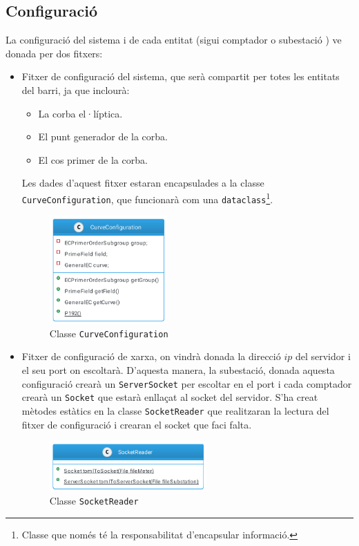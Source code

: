 \subsection{Configuració}
La configuració del sistema i de cada entitat (sigui comptador o subestació ) ve donada per dos fitxers:
\begin{itemize}
	\item Fitxer de configuració del sistema, que serà compartit per totes les entitats del barri, ja que inclourà:
	\begin{itemize}
		\item La corba el·líptica.
		\item El punt generador de la corba.
		\item El cos primer de la corba.
	\end{itemize}
	Les dades d'aquest fitxer estaran encapsulades a la classe \texttt{CurveConfiguration}, que funcionarà com una \texttt{dataclass}\footnote{Classe que només té la responsabilitat d'encapsular informació.}.
	\begin{figure}[H]
		\centering
		\includegraphics[width=4.5cm]{classes/curve.png}
		\caption{Classe \texttt{CurveConfiguration}}
		\label{fig:curve}
	\end{figure}
	\item Fitxer de configuració de xarxa, on vindrà donada la direcció $ip$ del servidor i el seu port on escoltarà. D'aquesta manera, la subestació, donada aquesta configuració crearà un \texttt{ServerSocket} per escoltar en el port i cada comptador crearà un \texttt{Socket} que estarà enllaçat al socket del servidor. S'ha creat mètodes estàtics en la classe \texttt{SocketReader} que realitzaran la lectura del fitxer de configuració i crearan el socket que faci falta.
	\begin{figure}[H]
		\centering
		\includegraphics[width=6cm]{classes/socket.png}
		\caption{Classe \texttt{SocketReader}}
		\label{fig:socket}
	\end{figure}
	
\end{itemize}
